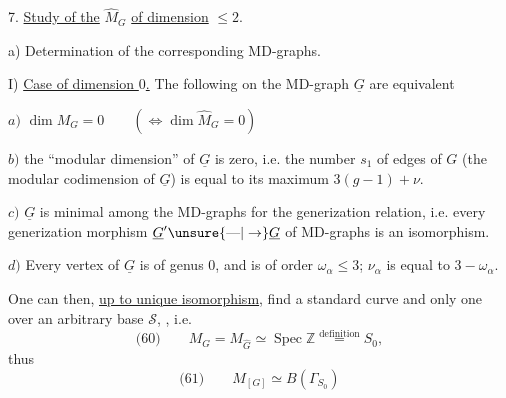 7. \uline{Study of the}  $\widehat M_G$  \uline{of dimension} $\leq 2$.

a) Determination of the corresponding MD-graphs.

I) \uline{Case of dimension $0$.} The following   on the MD-graph $\underline G$ are equivalent

$a)$ $\dim M_G=0\qquad(\Longleftrightarrow\dim\widehat M_G=0)$

$b)$  the ``modular dimension'' of $\underline G$ is zero, i.e. the number $s_1$ of edges of  $G$ (the modular codimension of $\underline G$) is equal to its maximum $3(g-1)+\nu$.

$c)$  $\underline G$ is minimal among the MD-graphs for the generization relation, i.e. every generization morphism $\underline G'\unsure{\mathbin{\text{---}}|\to}\underline G$ of MD-graphs is an isomorphism.

$d)$ Every vertex \inserted{$\alpha$} of $\underline G$ is of genus $0$, and is of order  $\omega_\alpha\leq3$;   $\nu_\alpha$ is equal to $3-\omega_\alpha$.

One can then, \uline{up to unique isomorphism}, find a standard  curve and only one over an arbitrary base $\mathcal S$, , i.e.
\[
\text{(60)}\qquad M_G=M_{\widehat G}\simeq\operatorname{Spec}\mathbb Z\overset{\mathrm{definition}}=S_0,
\]
thus
\[
\text{(61)}\qquad M_{[G]}\simeq B(\Gamma_{S_0})
\]
